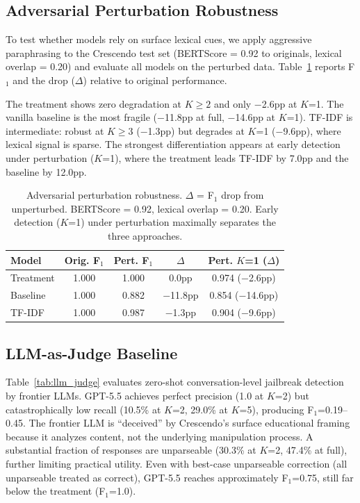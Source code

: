 \documentclass[11pt,a4paper]{article}
\newcommand{\fone}{F$_1$}
\begin{document}
\subsection{Adversarial Perturbation Robustness}
\label{sec:perturbation}

To test whether models rely on surface lexical cues, we apply aggressive paraphrasing to the Crescendo test set (BERTScore = 0.92 to originals, lexical overlap = 0.20) and evaluate all models on the perturbed data.
Table~\ref{tab:perturbation} reports \fone{} and the drop ($\Delta$) relative to original performance.

The treatment shows zero degradation at $K \geq 2$ and only $-$2.6pp at $K$=1.
The vanilla baseline is the most fragile ($-$11.8pp at full, $-$14.6pp at $K$=1).
TF-IDF is intermediate: robust at $K \geq 3$ ($-$1.3pp) but degrades at $K$=1 ($-$9.6pp), where lexical signal is sparse.
The strongest differentiation appears at early detection under perturbation ($K$=1), where the treatment leads TF-IDF by 7.0pp and the baseline by 12.0pp.

\begin{table}[t]
\centering
\caption{Adversarial perturbation robustness. $\Delta$ = \fone{} drop from unperturbed. BERTScore = 0.92, lexical overlap = 0.20. Early detection ($K$=1) under perturbation maximally separates the three approaches.}
\label{tab:perturbation}
\begin{tabular}{lcccc}
\toprule
Model & Orig. \fone{} & Pert. \fone{} & $\Delta$ & Pert. $K$=1 ($\Delta$) \\
\midrule
Treatment & 1.000 & 1.000 & 0.0pp & 0.974 ($-$2.6pp) \\
Baseline  & 1.000 & 0.882 & $-$11.8pp & 0.854 ($-$14.6pp) \\
TF-IDF    & 1.000 & 0.987 & $-$1.3pp & 0.904 ($-$9.6pp) \\
\bottomrule
\end{tabular}
\end{table}

\subsection{LLM-as-Judge Baseline}
\label{sec:llm_judge}

Table~\ref{tab:llm_judge} evaluates zero-shot conversation-level jailbreak detection by frontier LLMs.
GPT-5.5 achieves perfect precision (1.0 at $K$=2) but catastrophically low recall (10.5\% at $K$=2, 29.0\% at $K$=5), producing \fone{}=0.19--0.45.
The frontier LLM is ``deceived'' by Crescendo's surface educational framing because it analyzes content, not the underlying manipulation process.
A substantial fraction of responses are unparseable (30.3\% at $K$=2, 47.4\% at full), further limiting practical utility.
Even with best-case unparseable correction (all unparseable treated as correct), GPT-5.5 reaches approximately \fone{}=0.75, still far below the treatment (\fone{}=1.0).
\end{document}
